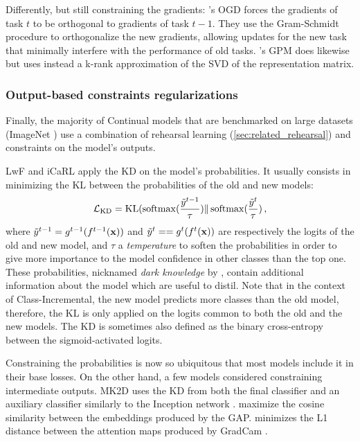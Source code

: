 Differently, but still constraining the gradients: \citet{farajtabar2020ogd}'s OGD forces the gradients of
task $t$ to be orthogonal to gradients of task $t-1$. They use the Gram-Schmidt procedure to
orthogonalize the new gradients, allowing updates for the new task that minimally interfere with the
performance of old tasks. \citet{saha2021gpm}'s GPM does likewise but uses instead a k-rank
approximation of the SVD of the representation matrix.


\subsubsection{Output-based constraints regularizations}
\label{sec:related_regul_output}

Finally, the majority of Continual models that are benchmarked on large datasets (\eg ImageNet
\citep{deng2009imagenet}) use a combination of rehearsal
learning (\autoref{sec:related_rehearsal}) and constraints on the model's outputs.

LwF \citep{li2018lwf} and iCaRL \citep{rebuffi2017icarl} apply the \ac{KD}
\citep{hinton2015knowledge_distillation} on the model's probabilities. It usually consists in
minimizing the \ac{KL} between the probabilities of the old and new models:
%
\begin{equation}
      \mathcal{L}_\text{KD} = \operatorname{KL}(\operatorname{softmax}(\frac{\tilde{y}^{t-1}}{\tau}) \Vert \operatorname{softmax}(\frac{\tilde{y}^t}{\tau})\,,
\end{equation}
%
where $\tilde{y}^{t-1} = g^{t-1} (f^{t-1}(\mathbf{x}))$ and $\tilde{y}^{t} = = g^{t} (f^{t}(\mathbf{x}))$ are respectively the logits of the old and new model,
and $\tau$ a \textit{temperature} to soften the probabilities in order to give more importance to
the model confidence in other classes than the top one. These probabilities, nicknamed \textit{dark
      knowledge} by \citet{hinton2015knowledge_distillation}, contain additional information about the
model which are useful to distil. Note that in the context of Class-Incremental, the new model
predicts more classes than the old model, therefore, the \ac{KL} is only applied on the logits
common to both the old and the new models. The \ac{KD} is sometimes also defined as the binary
cross-entropy between the sigmoid-activated logits.

Constraining the probabilities is now so ubiquitous that most models include it in their base
losses. On the other hand, a few models considered constraining intermediate outputs. MK2D
\citep{peng2019m2kd} uses the \ac{KD} from both the final classifier and an auxiliary classifier
similarly to the Inception network \citep{szegedy2015inception}. \citet{hou2019ucir} maximize the
cosine similarity between the embeddings produced by the \ac{GAP}.
\citet{dhar2019learning_without_memorizing_gradcam} minimizes the L1 distance between the attention
maps produced by GradCam \citep{selvaraju2017gradcam}.

